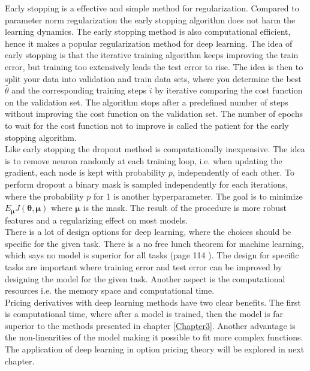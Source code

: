 Early stopping is a effective and simple method for regularization. Compared to parameter norm regularization the early stopping algorithm does not harm the learning dynamics. The early stopping method is also computational efficient, hence it makes a popular regularization method for deep learning. The idea of early stopping is that the iterative training algorithm keeps improving the train error, but training too extensively leads the test error to rise. The idea is then to split your data into validation and train data sets, where you determine the best $\hat{\theta}$ and the corresponding training steps $\hat{i}$ by iterative comparing the cost function on the validation set. The algorithm stops after a predefined number of steps without improving the cost function on the validation set. The number of epochs to wait for the cost function not to improve is called the patient for the early stopping algorithm.\\

Like early stopping the dropout method is computationally inexpensive. The idea is to remove neuron randomly at each training loop, i.e. when updating the gradient, each node is kept with probability $p$, independently of each other. To perform dropout a binary mask is sampled independently for each iterations, where the probability $p$ for 1 is another hyperparameter. The goal is to minimize $E_{\bm{\mu}} J(\bm{\theta}, \bm{\mu})$ where $\bm{\mu}$ is the mask. The result of the procedure is more robust features and a regularizing effect on most models.\\

There is a lot of design options for deep learning, where the choices should be specific for the given task. There is a no free lunch theorem for machine learning, which says no model is superior for all tasks (page 114 \parencite{Goodfellow-et-al-2016}). The design for specific tasks are important where training error and test error can be improved by designing the model for the given task. Another aspect is the computational resources i.e. the memory space and computational time. \\

Pricing derivatives with deep learning methods have two clear benefits. The first is computational time, where after a model is trained, then the model is far superior to the methods presented in chapter \ref{Chapter3}. Another advantage is the non-linearities of the model making it possible to fit more complex functions. The application of deep learning in option pricing theory will be explored in next chapter.
